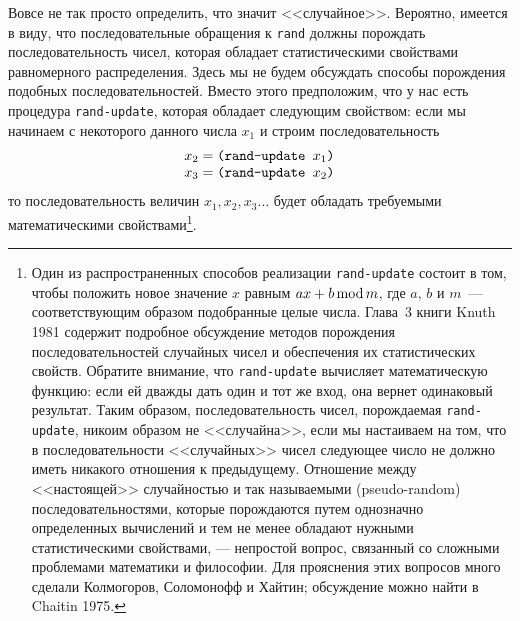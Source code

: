Вовсе не так просто определить, что значит <<случайное>>.
Вероятно, имеется в виду, что последовательные обращения к
{\tt rand} должны  порождать последовательность чисел, которая
обладает статистическими свойствами равномерного распределения.  Здесь
мы не будем обсуждать способы порождения подобных последовательностей.
Вместо этого предположим, что у нас есть процедура
{\tt rand-update}, которая обладает следующим свойством: если мы
начинаем с некоторого данного числа
$x_1$ и строим
последовательность
$$
\begin{array}{l}
x_2 = \mbox{\tt(rand-update $x_1$)}\\
x_3 = \mbox{\tt(rand-update $x_2$)}
\end{array}
$$
то последовательность величин
$x_1, x_2, x_3\ldots$
будет обладать требуемыми математическими свойствами\footnote{Один из распространенных способов реализации
  {\tt rand-update} состоит в том, чтобы положить новое значение
  $x$ равным $ax+b \mathop{\rm mod}
  m$, где $a$, $b$ и
  $m$~--- соответствующим образом подобранные целые
  числа.  Глава~3 книги Knuth 1981
  содержит подробное обсуждение методов порождения последовательностей
  случайных чисел и обеспечения их статистических свойств.  Обратите
  внимание, что {\tt rand-update} вычисляет математическую
  функцию: если ей дважды дать один и тот же вход, она вернет одинаковый
  результат.  Таким образом, последовательность чисел, порождаемая
  {\tt rand-update}, никоим образом не <<случайна>>, если мы
  настаиваем на том, что в последовательности <<случайных>> чисел
  следующее число не должно иметь никакого отношения к предыдущему.
  Отношение между <<настоящей>> случайностью и так называемыми
   (pseudo-random) последовательностями, которые
  порождаются путем однозначно определенных вычислений и тем не менее
  обладают нужными статистическими свойствами, --- непростой вопрос,
  связанный со сложными проблемами математики и философии.  Для
  прояснения этих вопросов много сделали Колмогоров, Соломонофф и Хайтин;
  обсуждение можно найти в Chaitin
  1975.}.

